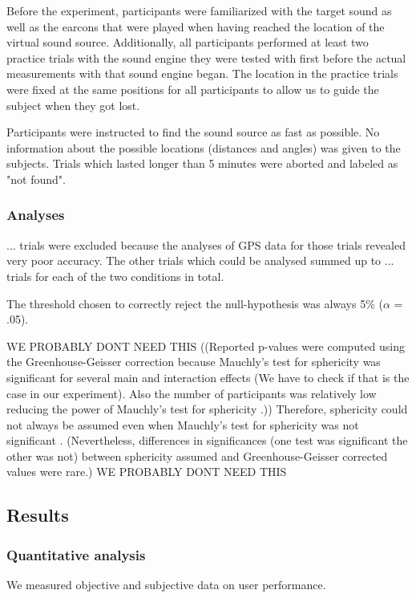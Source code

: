\documentclass[journal]{IEEEtran}
\begin{document}
Before the experiment, participants were familiarized with the target sound as well as the earcons that were played when having reached the location of the virtual sound source. Additionally, all participants performed at least two practice trials with the sound engine they were tested with first before the actual measurements with that sound engine began. The location in the practice trials were fixed at the same positions for all participants to allow us to guide the subject when they got lost. 

Participants were instructed to find the sound source as fast as possible. No information about the possible locations (distances and angles) was given to the subjects. Trials which lasted longer than 5 minutes were aborted and labeled as "not found". 

\subsubsection{Analyses}
... trials were excluded because the analyses of GPS data for those trials revealed very poor accuracy. The other trials which could be analysed summed up to ... trials for each of the two conditions in total.

The threshold chosen to correctly reject the null-hypothesis was always 5\% ($\alpha$ = .05). 

WE PROBABLY DONT NEED THIS 
((Reported p-values were computed using the Greenhouse-Geisser correction because Mauchly's test for sphericity was significant for several main and interaction effects (We have to check if that is the case in our experiment). Also the number of participants was relatively low reducing the power of Mauchly's test for sphericity \cite[p. 72]{Rasch2014}.)) Therefore, sphericity could not always be assumed even when Mauchly's test for sphericity was not significant \cite[p. 72]{Rasch2014}. (Nevertheless, differences in significances (one test was significant the other was not) between sphericity assumed and Greenhouse-Geisser corrected values were rare.) 
WE PROBABLY DONT NEED THIS 

\subsection{Results}
\subsubsection{Quantitative analysis}
We measured objective and subjective data on user performance. 
\end{document}
